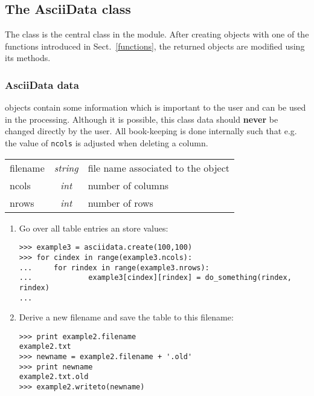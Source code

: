 %
%
\subsection{The AsciiData class}
\label{adclass}
The \ad class is the central class in the \AAD module.
After creating \ad objects with one of the functions introduced in
Sect.\ \ref{functions}, the returned objects are modified using
its methods.

\subsubsection{AsciiData data}
\label{add}
\ad objects contain some information which is important to the user
and can be used in the processing. Although it is possible,
this class data should {\bf never} be changed directly by the user.
All book-keeping is done internally such that e.g. the value of
{\tt ncols} is adjusted when deleting a column.

\begin{tabular}{lcl}
filename &{\it string}& file name associated to the object\\
ncols    &{\it int}& number of columns\\
nrows    &{\it int}& number of rows\\
\end{tabular}

\begin{enumerate}
\item Go over all table entries an store values:
\begin{small}
\begin{verbatim}
>>> example3 = asciidata.create(100,100)
>>> for cindex in range(example3.ncols):
...     for rindex in range(example3.nrows):
...             example3[cindex][rindex] = do_something(rindex, rindex)
...
\end{verbatim}
\end{small}
\item Derive a new filename and save the table to this filename:
\begin{verbatim}
>>> print example2.filename
example2.txt
>>> newname = example2.filename + '.old'
>>> print newname
example2.txt.old
>>> example2.writeto(newname)
\end{verbatim}
\end{enumerate}

